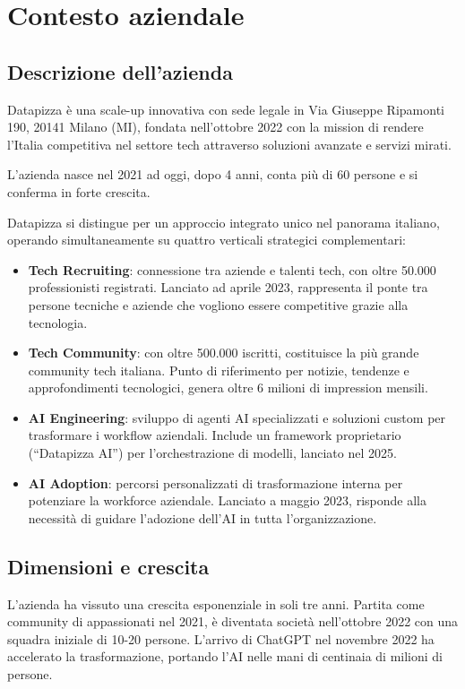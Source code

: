 \chapter{Contesto aziendale}
\sloppypar
\section{Descrizione dell'azienda}
Datapizza è una scale-up innovativa con sede legale in Via Giuseppe Ripamonti 190, 20141 Milano (MI), fondata nell'ottobre 2022 con la mission di rendere l'Italia competitiva nel settore tech attraverso soluzioni avanzate e servizi mirati.

L'azienda nasce nel 2021 ad oggi, dopo 4 anni, conta più di 60 persone e si conferma in forte crescita.

Datapizza si distingue per un approccio integrato unico nel panorama italiano, operando simultaneamente su quattro verticali strategici complementari:

\begin{itemize}
  \item \textbf{Tech Recruiting}: connessione tra aziende e talenti tech, con oltre 50.000 professionisti registrati. Lanciato ad aprile 2023, rappresenta il ponte tra persone tecniche e aziende che vogliono essere competitive grazie alla tecnologia.
  
  \item \textbf{Tech Community}: con oltre 500.000 iscritti, costituisce la più grande community tech italiana. Punto di riferimento per notizie, tendenze e approfondimenti tecnologici, genera oltre 6 milioni di impression mensili.
  
  \item \textbf{AI Engineering}: sviluppo di agenti AI specializzati e soluzioni custom per trasformare i workflow aziendali. Include un framework proprietario (``Datapizza AI'') per l'orchestrazione di modelli, lanciato nel 2025.
  
  \item \textbf{AI Adoption}: percorsi personalizzati di trasformazione interna per potenziare la workforce aziendale. Lanciato a maggio 2023, risponde alla necessità di guidare l'adozione dell'AI in tutta l'organizzazione.
\end{itemize}

\section{Dimensioni e crescita}
L'azienda ha vissuto una crescita esponenziale in soli tre anni. Partita come community di appassionati nel 2021, è diventata società nell'ottobre 2022 con una squadra iniziale di 10-20 persone. L'arrivo di ChatGPT nel novembre 2022 ha accelerato la trasformazione, portando l'AI nelle mani di centinaia di milioni di persone.

